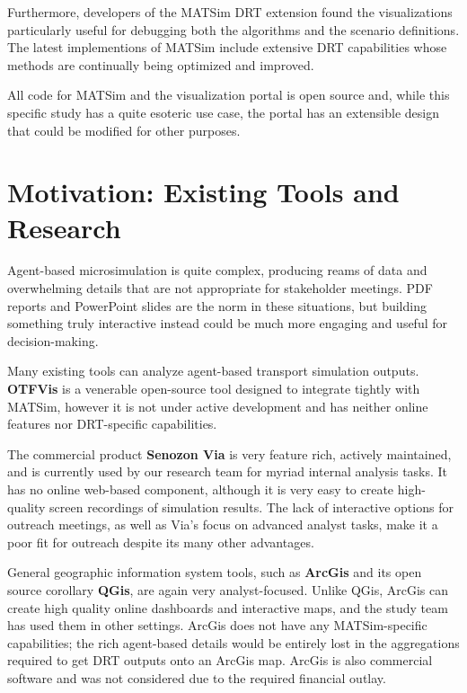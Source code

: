 \documentclass[3p,times,procedia]{elsarticle}
\begin{document}
Furthermore, developers of the MATSim DRT extension found the visualizations particularly useful for debugging both the algorithms and the scenario definitions. The latest implementions of MATSim include extensive DRT capabilities whose methods are continually being optimized and improved.

All code for MATSim and the visualization portal is open source and, while this specific study has a quite esoteric use case, the portal has an extensible design that could be modified for other purposes.

\section{Motivation: Existing Tools and Research}
\label{motivation}

Agent-based microsimulation is quite complex, producing reams of data and overwhelming details that are not appropriate for stakeholder meetings. PDF reports and PowerPoint slides are the norm in these situations, but building something truly interactive instead could be much more engaging and useful for decision-making.

Many existing tools can analyze agent-based transport simulation outputs. \textbf{OTFVis} \cite{Srippgen2015OTFVisInBook} is a venerable open-source tool designed to integrate tightly with MATSim, however it is not under active development and has neither online features nor DRT-specific capabilities.

The commercial product \textbf{Senozon Via} \cite{Rieser2015SenozonViaInBook} is very feature rich, actively maintained, and is currently used by our research team for myriad internal analysis tasks. It has no online web-based component, although it is very easy to create high-quality screen recordings of simulation results. The lack of interactive options for outreach meetings, as well as Via's focus on advanced analyst tasks, make it a poor fit for outreach despite its many other advantages.

General geographic information system tools, such as \textbf{ArcGis} and its open source corollary \textbf{QGis}, are again very analyst-focused. Unlike QGis, ArcGis can create high quality online dashboards and interactive maps, and the study team has used them in other settings. ArcGis does not have any MATSim-specific capabilities; the rich agent-based details would be entirely lost in the aggregations required to get DRT outputs onto an ArcGis map. ArcGis is also commercial software and was not considered due to the required financial outlay.
\end{document}
